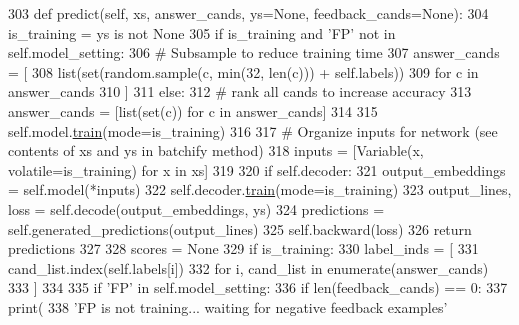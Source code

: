 \begin{DoxyCode}
303     \textcolor{keyword}{def }predict(self, xs, answer\_cands, ys=None, feedback\_cands=None):
304         is\_training = ys \textcolor{keywordflow}{is} \textcolor{keywordflow}{not} \textcolor{keywordtype}{None}
305         \textcolor{keywordflow}{if} is\_training \textcolor{keywordflow}{and} \textcolor{stringliteral}{'FP'} \textcolor{keywordflow}{not} \textcolor{keywordflow}{in} self.model\_setting:
306             \textcolor{comment}{# Subsample to reduce training time}
307             answer\_cands = [
308                 list(set(random.sample(c, min(32, len(c))) + self.labels))
309                 \textcolor{keywordflow}{for} c \textcolor{keywordflow}{in} answer\_cands
310             ]
311         \textcolor{keywordflow}{else}:
312             \textcolor{comment}{# rank all cands to increase accuracy}
313             answer\_cands = [list(set(c)) \textcolor{keywordflow}{for} c \textcolor{keywordflow}{in} answer\_cands]
314 
315         self.model.\hyperlink{namespaceprojects_1_1mastering__the__dungeon_1_1mturk_1_1tasks_1_1MTD_1_1run_a36a5f4f6f9df0611a6818610518d2cf0}{train}(mode=is\_training)
316 
317         \textcolor{comment}{# Organize inputs for network (see contents of xs and ys in batchify method)}
318         inputs = [Variable(x, volatile=is\_training) \textcolor{keywordflow}{for} x \textcolor{keywordflow}{in} xs]
319 
320         \textcolor{keywordflow}{if} self.decoder:
321             output\_embeddings = self.model(*inputs)
322             self.decoder.\hyperlink{namespaceprojects_1_1mastering__the__dungeon_1_1mturk_1_1tasks_1_1MTD_1_1run_a36a5f4f6f9df0611a6818610518d2cf0}{train}(mode=is\_training)
323             output\_lines, loss = self.decode(output\_embeddings, ys)
324             predictions = self.generated\_predictions(output\_lines)
325             self.backward(loss)
326             \textcolor{keywordflow}{return} predictions
327 
328         scores = \textcolor{keywordtype}{None}
329         \textcolor{keywordflow}{if} is\_training:
330             label\_inds = [
331                 cand\_list.index(self.labels[i])
332                 \textcolor{keywordflow}{for} i, cand\_list \textcolor{keywordflow}{in} enumerate(answer\_cands)
333             ]
334 
335             \textcolor{keywordflow}{if} \textcolor{stringliteral}{'FP'} \textcolor{keywordflow}{in} self.model\_setting:
336                 \textcolor{keywordflow}{if} len(feedback\_cands) == 0:
337                     print(
338                         \textcolor{stringliteral}{'FP is not training... waiting for negative feedback examples'}

\end{DoxyCode}
